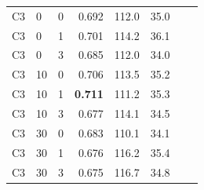 \documentclass[pdflatex,sn-mathphys-num]{sn-jnl}%
\theoremstyle{thmstyleone}%
\theoremstyle{thmstyletwo}%
\theoremstyle{thmstylethree}%
\begin{document}
\begin{appendices}
\begin{table}[htbp]
\begin{tabular}{llrrrrrr}
\addlinespace[4pt]
C3 & 0 & 0 & 0.692 & 112.0 & 35.0 \\
C3 & 0 & 1 & 0.701 & 114.2 & 36.1 \\
C3 & 0 & 3 & 0.685 & 112.0 & 34.0 \\
C3 & 10 & 0 & 0.706 & 113.5 & 35.2 \\
C3 & 10 & 1 & \textbf{0.711} & 111.2 & 35.3 \\
C3 & 10 & 3 & 0.677 & 114.1 & 34.5 \\
C3 & 30 & 0 & 0.683 & 110.1 & 34.1 \\
C3 & 30 & 1 & 0.676 & 116.2 & 35.4 \\
C3 & 30 & 3 & 0.675 & 116.7 & 34.8 \\
\bottomrule
\end{tabular}
\end{table}


\end{appendices}
\end{document}
